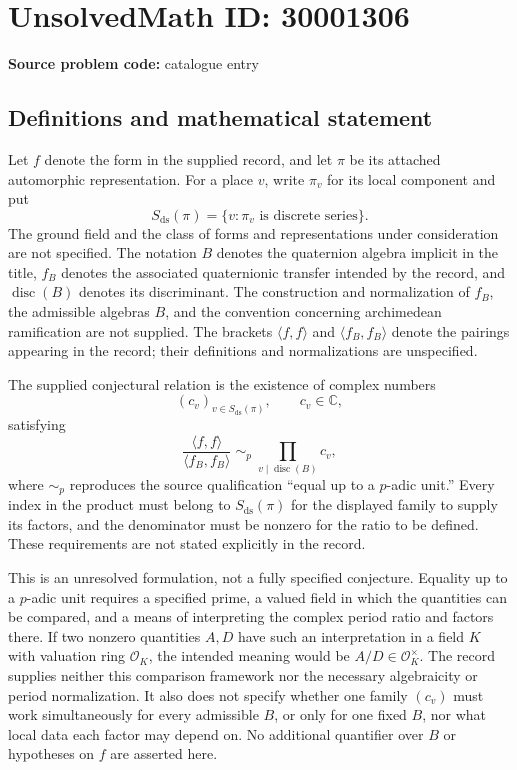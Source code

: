 \documentclass[11pt]{article}
\newcommand{\C}{\mathbb{C}}
\begin{document}
\section*{UnsolvedMath ID: 30001306}
\textbf{Source problem code:} catalogue entry
\subsection{Definitions and mathematical statement}
Let \(f\) denote the form in the supplied record, and let \(\pi\) be its attached automorphic representation. For a place \(v\), write \(\pi_v\) for its local component and put
\[
S_{\mathrm{ds}}(\pi)=\{v:\pi_v\text{ is discrete series}\}.
\]
The ground field and the class of forms and representations under consideration are not specified. The notation \(B\) denotes the quaternion algebra implicit in the title, \(f_B\) denotes the associated quaternionic transfer intended by the record, and \(\operatorname{disc}(B)\) denotes its discriminant. The construction and normalization of \(f_B\), the admissible algebras \(B\), and the convention concerning archimedean ramification are not supplied. The brackets \(\langle f,f\rangle\) and \(\langle f_B,f_B\rangle\) denote the pairings appearing in the record; their definitions and normalizations are unspecified.

The supplied conjectural relation is the existence of complex numbers
\[
(c_v)_{v\in S_{\mathrm{ds}}(\pi)},\qquad c_v\in\C,
\]
satisfying
\[
\frac{\langle f,f\rangle}{\langle f_B,f_B\rangle}
\;\sim_p\;
\prod_{v\mid\operatorname{disc}(B)}c_v,
\]
where \(\sim_p\) reproduces the source qualification ``equal up to a \(p\)-adic unit.'' Every index in the product must belong to \(S_{\mathrm{ds}}(\pi)\) for the displayed family to supply its factors, and the denominator must be nonzero for the ratio to be defined. These requirements are not stated explicitly in the record.

This is an unresolved formulation, not a fully specified conjecture. Equality up to a \(p\)-adic unit requires a specified prime, a valued field in which the quantities can be compared, and a means of interpreting the complex period ratio and factors there. If two nonzero quantities \(A,D\) have such an interpretation in a field \(K\) with valuation ring \(\mathcal O_K\), the intended meaning would be \(A/D\in\mathcal O_K^{\times}\). The record supplies neither this comparison framework nor the necessary algebraicity or period normalization. It also does not specify whether one family \((c_v)\) must work simultaneously for every admissible \(B\), or only for one fixed \(B\), nor what local data each factor may depend on. No additional quantifier over \(B\) or hypotheses on \(f\) are asserted here.
\end{document}
